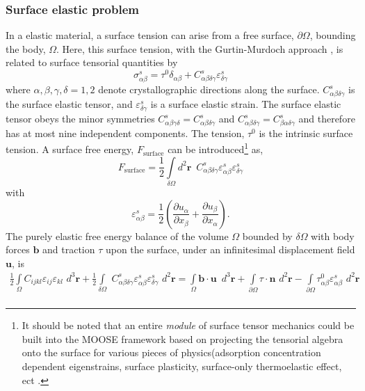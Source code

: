 \documentclass[16pt]{article} %
\begin{document}
\subsubsection{Surface elastic problem}
%
In a elastic material, a surface tension can arise from a free surface, $\partial \Omega$, bounding the body, $\Omega$.
%
Here, this surface tension, with the Gurtin-Murdoch approach \cite{Morton1975},  is related to surface tensorial quantities by
%
\begin{equation}\tag{3.1}
\sigma_{\alpha \beta}^s = \tau^0 \delta_{\alpha \beta} + C_{\alpha \beta \delta \gamma}^s \varepsilon_{\delta \gamma}^s
\end{equation}
%
where $\alpha, \beta, \gamma, \delta = 1,2$ denote crystallographic directions along the surface.
%
$C_{\alpha \beta \delta \gamma}^s$ is the surface elastic tensor, and $\varepsilon_{\delta \gamma}^s$ is a surface elastic strain. The surface elastic tensor obeys the minor symmetries $C_{\alpha \beta \gamma \delta}^s = C_{\alpha \beta \delta \gamma }^s$ and $C_{\alpha \beta \delta \gamma}^s = C_{\beta \alpha \delta \gamma }^s$ and therefore has at most nine independent components.
%
The tension, $\tau^0$ is the intrinsic surface tension.
%
A surface free energy, $F_\mathrm{surface}$ can be introduced\footnote{It should be noted that an entire \emph{module} of surface tensor mechanics could be built into the MOOSE framework based on projecting the tensorial algebra onto the surface for various pieces of physics(adsorption concentration dependent eigenstrains, surface plasticity, surface-only thermoelastic effect, ect .} as,
%
\begin{equation}\tag{3.5}
F_\mathrm{surface} = \frac{1}{2} \int\limits_{\delta \Omega} d^2 \textbf{r} \,\,\, C_{\alpha \beta \delta \gamma }^s \varepsilon_{\alpha \beta}^s \varepsilon_{\delta \gamma}^s 
\end{equation}
%
with
%
\begin{equation}\tag{3.6}
 \varepsilon_{\alpha \beta}^s = \frac{1}{2} \left(\frac{\partial u_\alpha}{\partial x_\beta} + \frac{\partial u_\beta}{\partial x_\alpha} \right).
\end{equation}
%
The purely elastic free energy balance of the volume $\Omega$ bounded by $\delta \Omega$ with body forces $\textbf{b}$ and traction $\tau$ upon the surface, under an infinitesimal displacement field $\textbf{u}$, is
%
\begin{align}\tag{3.7}
 \frac{1}{2} \int\limits_\Omega C_{ijkl} \varepsilon_{ij} \varepsilon_{kl} \,\,d^3 \textbf{r} + \frac{1}{2} \int\limits_{\delta \Omega} \,\, C_{\alpha \beta \delta \gamma}^s \varepsilon_{\alpha \beta}^s \varepsilon_{\delta \gamma}^s\,\, d^2 \textbf{r} = \int\limits_\Omega \textbf{b} \cdot \textbf{u} \,\,\,d^3 \textbf{r} + \int\limits_{\partial \Omega} \tau \cdot \mathbf{\hat{n}} \,\,d^2 \textbf{r} - \int\limits_{\partial \Omega} \tau^0_{\alpha \beta} \varepsilon_{\alpha \beta}^s \,\,d^2 \textbf{r} \\ \nonumber
\end{align}
\end{document}
